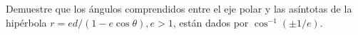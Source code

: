 \item Demuestre que los ángulos comprendidos entre el eje polar y las asíntotas de la hipérbola $r = ed/(1 - e\cos\theta), e > 1$, están dados por \linebreak $\cos^{-1}(\pm 1/e)$.
